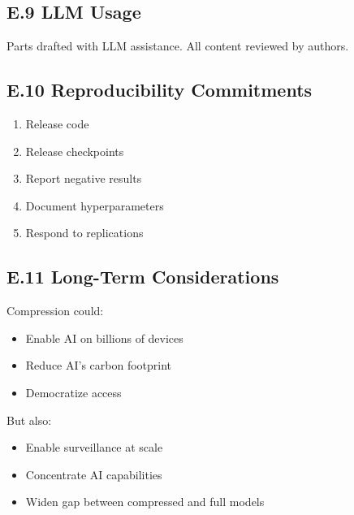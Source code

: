 \subsection{E.9 LLM Usage}

Parts drafted with LLM assistance. All content reviewed by authors.

\subsection{E.10 Reproducibility Commitments}

\begin{enumerate}
\item Release code
\item Release checkpoints
\item Report negative results
\item Document hyperparameters
\item Respond to replications

\end{enumerate}
\subsection{E.11 Long-Term Considerations}

Compression could:

\begin{itemize}
\item Enable AI on billions of devices
\item Reduce AI's carbon footprint
\item Democratize access

\end{itemize}
But also:

\begin{itemize}
\item Enable surveillance at scale
\item Concentrate AI capabilities
\item Widen gap between compressed and full models
\end{itemize}

